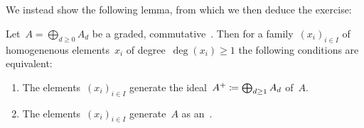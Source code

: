 \section{}

We instead show the following lemma, from which we then deduce the exercise:

\begin{lemma}
  \label{bourbaki lemma}
  Let~$A = \bigoplus_{d \geq 0} A_d$ be a graded, commutative~{\kalg}.
  Then for a family~$(x_i)_{i \in I}$ of homogenenous elements~$x_i$ of degree~$\deg(x_i) \geq 1$ the following conditions are equivalent:
  \begin{enumerate}
    \item
      \label{ideal}
      The elements~$(x_i)_{i \in I}$ generate the ideal~$A^+ \coloneqq \bigoplus_{d \geq 1} A_d$ of~$A$.
    \item
      \label{algebra}
      The elements~$(x_i)_{i \in I}$ generate~$A$ as an~.
  \end{enumerate}
\end{lemma}

